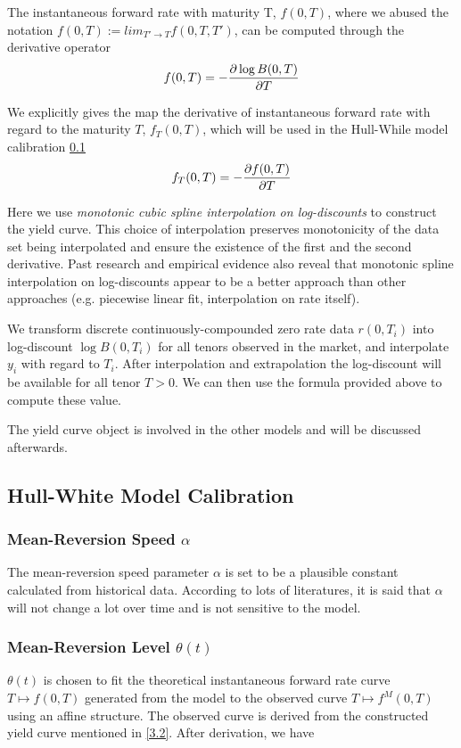 \documentclass[11pt]{article}
\numberwithin{equation}{section}
\theoremstyle{remark}
\begin{document}
The instantaneous forward rate with maturity T, $f(0, T)$, where we abused the notation $f(0, T) := lim_{T' \to T} f(0,T,T')$, can be computed through the derivative operator
$$f(0,T)= -\pdv{\log B(0, T)}{T} $$

We explicitly gives the map the derivative of instantaneous forward rate with regard to the maturity $T$, $f_T(0, T)$, which will be used in the Hull-While model calibration \ref{3.3}
$$f_T(0,T)= -\pdv{f(0, T)}{T} $$

Here we use \textit{monotonic cubic spline interpolation on log-discounts} to construct the yield curve. This choice of interpolation preserves monotonicity of the data set being interpolated and ensure the existence of the first and the second derivative. Past research and empirical evidence also reveal that monotonic spline interpolation on log-discounts appear to be a better approach than other approaches (e.g. piecewise linear fit, interpolation on rate itself).

We transform discrete continuously-compounded zero rate data $r(0, T_i)$ into log-discount $\log B(0, T_i)$ for all tenors observed in the market, and interpolate $y_i$ with regard to $T_i$. After interpolation and extrapolation the log-discount will be available for all tenor $T > 0$. We can then use the formula provided above to compute these value.

The yield curve object is involved in the other models and will be discussed afterwards.

\subsection{Hull-White Model Calibration}\label{3.3}
\subsubsection{Mean-Reversion Speed $\alpha$}\label{3.3.1}
The mean-reversion speed parameter $\alpha$ is set to be a plausible constant calculated from historical data. According to lots of literatures, it is said that $\alpha$ will not change a lot over time and is not sensitive to the model.

\subsubsection{Mean-Reversion Level $\theta(t)$}\label{3.3.2}
$\theta(t)$ is chosen to fit the theoretical instantaneous forward rate curve $T \mapsto f(0,T)$ generated from the model to the observed curve $T \mapsto f^M(0,T)$ using an affine structure. The observed curve is derived from the constructed yield curve mentioned in \ref{3.2}. After derivation, we have
\end{document}
